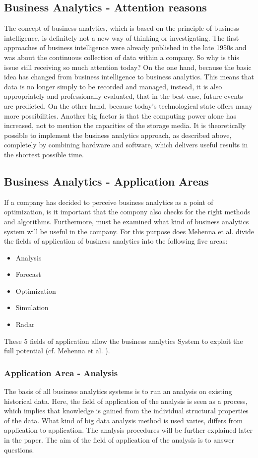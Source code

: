 \documentclass[12pt,twocolumn,twoside]{conference}   %
\begin{document}
\subsection{Business Analytics - Attention reasons}
The concept of business analytics, which is based on the principle of business intelligence, is definitely not a new way of thinking or investigating. The first approaches of business intelligence were already published in the late 1950s and was about the continuous collection of data within a company. So why is this issue still receiving so much attention today? On the one hand, because the basic idea has changed from business intelligence to business analytics. This means that data is no longer simply to be recorded and managed, instead, it is also appropriately and professionally evaluated, that in the best case, future events are predicted. On the other hand, because today's technological state offers many more possibilities. Another big factor is that the computing power alone has increased, not to mention the capacities of the storage media.  It is theoretically possible to implement the business analytics approach, as described above, completely by combining hardware and software, which delivers useful results in the shortest possible time.

\subsection{Business Analytics - Application Areas}
If a company has decided to perceive business analytics as a point of optimization, is it important that the compony also checks for the right methods and algorithms. Furthermore, must be examined what kind of business analytics system will be useful in the company. For this purpose does Mehenna et al. divide the fields of application of business analytics into the following five areas:

\begin{itemize}
\item Analysis
\item Forecast
\item Optimization
\item Simulation
\item Radar
\end{itemize}

These 5 fields of application allow the business analytics System to exploit the full potential (cf. Mehenna et al. \cite{2}).

\subsubsection{Application Area - Analysis}
The basis of all business analytics systems is to run an analysis on existing historical data. Here, the field of application of the analysis is seen as a process, which implies that knowledge is gained from the individual structural properties of the data. What kind of big data analysis method is used varies, differs from application to application. The analysis procedures will be further explained later in the paper. The aim of the field of application of the analysis is to answer questions. 
\end{document}
